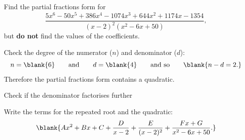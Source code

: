 \begin{example}[Video]
Find the partial fractions form for
\[
\frac{5x^6-50x^5+386x^4-1074x^3+644x^2+1174x-1354}{(x-2)^2(x^2-6x+50)},
\]
but \textbf{do not} find the values of the coefficients.
\end{example}

\begin{solution}
Check the degree of the numerator ($n$) and denominator ($d$):
\[
n=\blank{6} \qquad\text{and}\qquad d=\blank{4} \qquad\text{and so}\qquad \blank{n-d=2.}
\]
Therefore the partial fractions form contains a quadratic.

Check if the denominator factorises further \par
{}

Write the terms for the repeated root and the quadratic:
\[
\blank{Ax^2+Bx+C+\frac{D}{x-2}+\frac{E}{(x-2)^2}+\frac{Fx+G}{x^2-6x+50}.}
\]
\end{solution}
